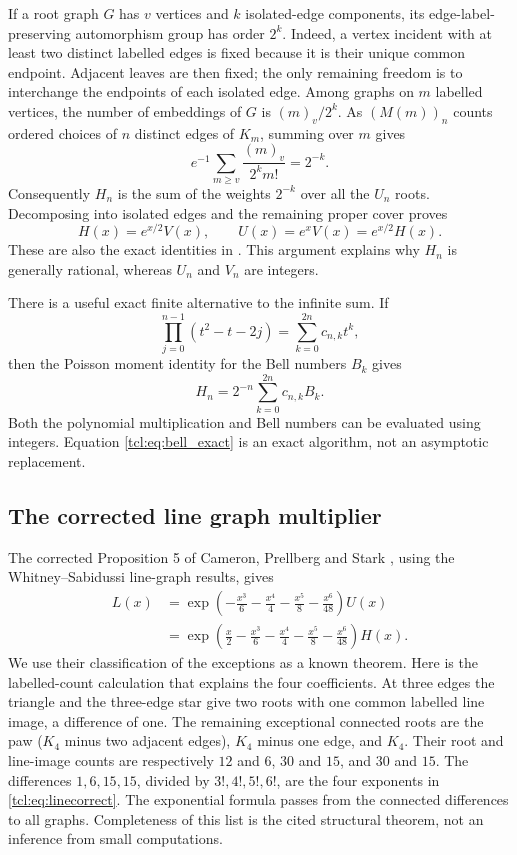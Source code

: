 If a root graph $G$ has $v$ vertices and $k$ isolated-edge components, its edge-label-preserving automorphism group has order $2^k$. Indeed, a vertex incident with at least two distinct labelled edges is fixed because it is their unique common endpoint. Adjacent leaves are then fixed; the only remaining freedom is to interchange the endpoints of each isolated edge. Among graphs on $m$ labelled vertices, the number of embeddings of $G$ is $(m)_v/2^k$. As $(M(m))_n$ counts ordered choices of $n$ distinct edges of $K_m$, summing over $m$ gives
\[
e^{-1}\sum_{m\ge v}\frac{(m)_v}{2^k m!}=2^{-k}.
\]
Consequently $H_n$ is the sum of the weights $2^{-k}$ over all the $U_n$ roots. Decomposing into isolated edges and the remaining proper cover proves
\begin{equation}\label{tcl:eq:VU}
H(x)=e^{x/2}V(x),\qquad U(x)=e^xV(x)=e^{x/2}H(x).
\end{equation}
These are also the exact identities in \cite[Proposition 3 and equation (18)]{cps}. This argument explains why $H_n$ is generally rational, whereas $U_n$ and $V_n$ are integers.

There is a useful exact finite alternative to the infinite sum. If
\[
\prod_{j=0}^{n-1}(t^2-t-2j)=\sum_{k=0}^{2n}c_{n,k}t^k,
\]
then the Poisson moment identity for the Bell numbers $B_k$ gives
\begin{equation}\label{tcl:eq:bell_exact}
H_n=2^{-n}\sum_{k=0}^{2n}c_{n,k}B_k.
\end{equation}
Both the polynomial multiplication and Bell numbers can be evaluated using integers. Equation \eqref{tcl:eq:bell_exact} is an exact algorithm, not an asymptotic replacement.

\subsection{The corrected line graph multiplier}
The corrected Proposition 5 of Cameron, Prellberg and Stark \cite[p.~6]{cps}, using the Whitney--Sabidussi line-graph results, gives
\begin{align}
L(x)&=\exp\left(-\frac{x^3}{6}-\frac{x^4}{4}-\frac{x^5}{8}-\frac{x^6}{48}\right)U(x)\label{tcl:eq:linecorrect}\\
&=\exp\left(\frac{x}{2}-\frac{x^3}{6}-\frac{x^4}{4}-\frac{x^5}{8}-\frac{x^6}{48}\right)H(x).\nonumber
\end{align}
We use their classification of the exceptions as a known theorem. Here is the labelled-count calculation that explains the four coefficients. At three edges the triangle and the three-edge star give two roots with one common labelled line image, a difference of one. The remaining exceptional connected roots are the paw ($K_4$ minus two adjacent edges), $K_4$ minus one edge, and $K_4$. Their root and line-image counts are respectively $12$ and $6$, $30$ and $15$, and $30$ and $15$. The differences $1,6,15,15$, divided by $3!,4!,5!,6!$, are the four exponents in \eqref{tcl:eq:linecorrect}. The exponential formula passes from the connected differences to all graphs. Completeness of this list is the cited structural theorem, not an inference from small computations.

